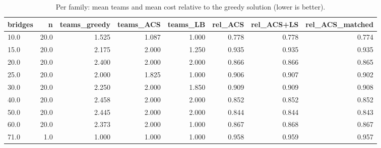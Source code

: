 \begin{table}[t]
\centering
\small
\begin{tabular}{lrrrrrrr}
\toprule
bridges & n & teams\_greedy & teams\_ACS & teams\_LB & rel\_ACS & rel\_ACS+LS & rel\_ACS\_matched \\
\midrule
10.0 & 20.0 & 1.525 & 1.087 & 1.000 & 0.778 & 0.778 & 0.774 \\
15.0 & 20.0 & 2.175 & 2.000 & 1.250 & 0.935 & 0.935 & 0.935 \\
20.0 & 20.0 & 2.400 & 2.000 & 2.000 & 0.866 & 0.866 & 0.865 \\
25.0 & 20.0 & 2.000 & 1.825 & 1.000 & 0.906 & 0.907 & 0.902 \\
30.0 & 20.0 & 2.250 & 2.000 & 1.850 & 0.909 & 0.909 & 0.908 \\
40.0 & 20.0 & 2.458 & 2.000 & 2.000 & 0.852 & 0.852 & 0.852 \\
50.0 & 20.0 & 2.445 & 2.000 & 2.000 & 0.844 & 0.844 & 0.843 \\
60.0 & 20.0 & 2.373 & 2.000 & 1.000 & 0.867 & 0.868 & 0.867 \\
71.0 & 1.0 & 1.000 & 1.000 & 1.000 & 0.958 & 0.959 & 0.957 \\
\bottomrule
\end{tabular}
\caption{Per family: mean teams and mean cost relative to the greedy solution (lower is better).}
\label{tab:family}
\end{table}
